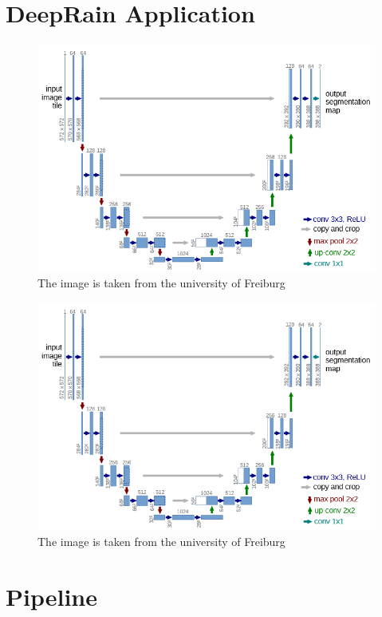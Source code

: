\documentclass[oneside]{htwg-report}
\begin{document}
\begin{sloppypar}
\noindent
\end{sloppypar}

\section*{DeepRain Application}

\begin{figure}[ht]
    \centering
    \includegraphics[width=0.8\linewidth]{../pics/UNet_Biomedical}
    \caption{The image is taken from the university of Freiburg~\cite{ronneberger2015u}}
\end{figure}


\begin{figure}[ht]
    \centering
    \includegraphics[width=0.8\linewidth]{../pics/UNet_Biomedical}
    \caption{The image is taken from the university of Freiburg~\cite{ronneberger2015u}}
\end{figure}



\section*{Pipeline}
\end{document}
